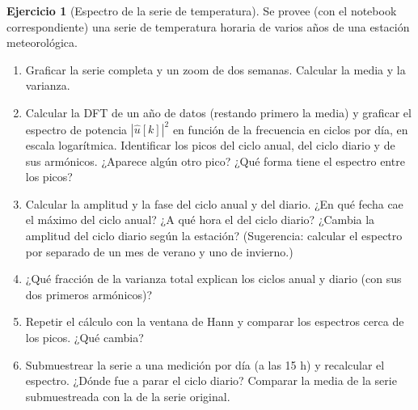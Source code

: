 \documentclass[12pt, a4paper]{amsbook}
\theoremstyle{remark}
\theoremstyle{definition}
\newtheorem{ejer}[teo]{Ejercicio}
\numberwithin{section}{chapter}
\numberwithin{subsection}{section}
\numberwithin{equation}{section}
\numberwithin{figure}{chapter}
\begin{document}
\begin{ejer}[Espectro de la serie de temperatura]\label{lab:temperatura}
Se provee (con el notebook correspondiente) una serie de temperatura horaria de varios años de una estación meteorológica.
\begin{enumerate}
\item Graficar la serie completa y un zoom de dos semanas. Calcular la media y la varianza.
\item Calcular la DFT de un año de datos (restando primero la media) y graficar el espectro de potencia $|\hat u[k]|^2$ en función de la frecuencia en ciclos por día, en escala logarítmica. Identificar los picos del ciclo anual, del ciclo diario y de sus armónicos. ¿Aparece algún otro pico? ¿Qué forma tiene el espectro entre los picos?
\item Calcular la amplitud y la fase del ciclo anual y del diario. ¿En qué fecha cae el máximo del ciclo anual? ¿A qué hora el del ciclo diario? ¿Cambia la amplitud del ciclo diario según la estación? (Sugerencia: calcular el espectro por separado de un mes de verano y uno de invierno.)
\item ¿Qué fracción de la varianza total explican los ciclos anual y diario (con sus dos primeros armónicos)?
\item Repetir el cálculo con la ventana de Hann y comparar los espectros cerca de los picos. ¿Qué cambia?
\item Submuestrear la serie a una medición por día (a las 15 h) y recalcular el espectro. ¿Dónde fue a parar el ciclo diario? Comparar la media de la serie submuestreada con la de la serie original.
\end{enumerate}
\end{ejer}
\end{document}
